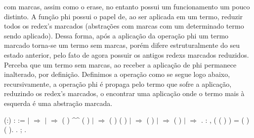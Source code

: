 com marcas, assim como o erase, no entanto possui um funcionamento um pouco distinto. A função phi
possui o papel de, ao ser aplicada em um termo, reduzir todos os redex's marcados (abstrações
com marcas com um determinado termo sendo aplicado). Dessa forma, após a aplicação da operação phi
um termo marcado torna-se um termo sem marcas, porém difere estruturalmente do seu estado anterior,
pelo fato de agora possuir os antigos redexs marcados reduzidos. Perceba que um termo sem marcas, ao
receber a aplicação de phi permanece inalterado, por definição. Definimos a operação como se segue logo
abaixo, recursivamente, a operação phi é propaga pelo termo que sofre a aplicação, reduzindo os redex's
marcados, o encontrar uma aplicação onde o termo mais à esquerda é uma abstração marcada.\begin{coqdoccode}
\coqdocemptyline
\coqdocnoindent
{}  (:) :  :=\coqdoceol
\coqdocindent{1.00em}
  \coqdoceol
\coqdocindent{1.00em}
\ensuremath{|}    \ensuremath{\Rightarrow}   \coqdoceol
\coqdocindent{11.00em}
\ensuremath{|}   \ensuremath{\Rightarrow} ( ) \^{}\^{} ( )\coqdoceol
\coqdocindent{11.00em}
\ensuremath{|} \coqdocvar{\_} \ensuremath{\Rightarrow}  ( ) ( )\coqdoceol
\coqdocindent{11.00em}
\coqdoceol
\coqdocindent{1.00em}
\ensuremath{|}   \ensuremath{\Rightarrow}  ( )\coqdoceol
\coqdocindent{1.00em}
\ensuremath{|}   \ensuremath{\Rightarrow}  ( )\coqdoceol
\coqdocindent{1.00em}
\ensuremath{|} \coqdocvar{\_} \ensuremath{\Rightarrow} \coqdoceol
\coqdocindent{1.00em}
.\coqdoceol
\coqdocemptyline
\coqdocnoindent
{} : \coqdockw{\ensuremath{\forall}}   , (  ( ) ) =   ( ) ( ).\coqdoceol
\coqdocnoindent
{}.\coqdoceol
\coqdocindent{1.00em}
 ;  .\coqdoceol

\end{coqdoccode}

